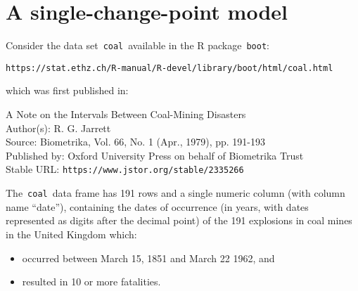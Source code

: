 

\section{A single-change-point model}
\setcounter{theorem}{0}
\setcounter{equation}{0}


\renewcommand{\theenumi}{\roman{enumi}}
\renewcommand{\labelenumi}{\textnormal{(\theenumi)}$\;\;$}


Consider the data set \,\texttt{coal}\, available in the R package \,\texttt{boot}:
\begin{center}
\texttt{https://stat.ethz.ch/R-manual/R-devel/library/boot/html/coal.html}
\end{center}
which was first published in:
\begin{center}
\begin{minipage}{5in}
A Note on the Intervals Between Coal-Mining Disasters \\
Author(s): R. G. Jarrett \\
Source: Biometrika, Vol. 66, No. 1 (Apr., 1979), pp. 191-193 \\
Published by: Oxford University Press on behalf of Biometrika Trust \\
Stable URL: \texttt{https://www.jstor.org/stable/2335266}
\end{minipage}
\end{center}

\vskip 0.5cm
\noindent
The \,\texttt{coal}\, data frame has 191 rows and a single numeric column (with column name ``date''),
containing the dates of occurrence (in years, with dates represented as digits after the decimal point)
of the 191 explosions in coal mines in the United Kingdom which:
\begin{itemize}
\item
	occurred between March 15, 1851 and March 22 1962, and
\item
	resulted in 10 or more fatalities.
\end{itemize}


